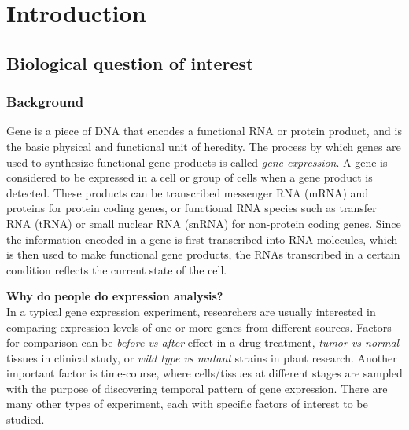 \section{Introduction}\label{sec:intro}

\subsection{Biological question of interest}\label{subsec:biol}

\subsubsection{Background}

Gene is a piece of DNA that encodes a functional RNA or protein product, and is the basic physical
and functional unit of heredity. The process by which genes are used to synthesize functional gene
products is called \textit{gene expression}.  A gene is considered to be expressed in a cell or
group of cells when a gene product is detected.
These products can be transcribed messenger RNA (mRNA) and proteins for protein coding genes, or
functional RNA species such as transfer RNA (tRNA) or small nuclear RNA (snRNA) for non-protein
coding genes.
Since the information encoded in a gene is first transcribed into RNA molecules, which is then used
to make functional gene products, the RNAs transcribed
in a certain condition reflects the current state of the cell.







\textbf{Why do people do expression analysis?}\\
In a typical gene expression experiment, researchers are usually interested in comparing expression
levels of one or more genes from different sources. Factors for comparison can be
\textit{before vs
	after} effect in a drug treatment, \textit{tumor vs normal} tissues in clinical study, or
\textit{wild type vs mutant} strains in plant research. Another important factor is time-course,
where cells/tissues at different stages are sampled with the purpose of discovering temporal pattern
of gene expression. There are many other types of experiment, each with specific factors of interest
to be studied.



